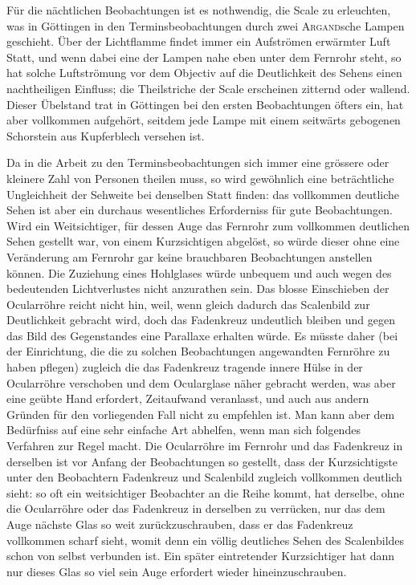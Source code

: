Für die nächtlichen Beobachtungen ist es nothwendig, die Scale zu erleuchten, was in Göttingen in den Terminsbeobachtungen durch zwei \textsc{Argand}sche Lampen geschieht. Über der Lichtflamme findet immer ein Aufströmen erwärmter Luft Statt, und wenn dabei eine der Lampen nahe eben unter dem Fernrohr steht, so hat solche Luftströmung vor dem Objectiv auf die Deutlichkeit des Sehens einen nachtheiligen Einfluss; die Theilstriche der Scale erscheinen zitternd oder wallend. Dieser Übelstand trat in Göttingen bei den ersten Beobachtungen öfters ein, hat aber vollkommen aufgehört, seitdem jede Lampe mit einem seitwärts gebogenen Schorstein aus Kupferblech versehen ist.

Da in die Arbeit zu den Terminsbeobachtungen sich immer eine grössere oder kleinere Zahl von Personen theilen muss, so wird gewöhnlich eine beträchtliche Ungleichheit der Sehweite bei denselben Statt finden: das vollkommen deutliche Sehen ist aber ein durchaus wesentliches Erforderniss für gute Beobachtungen. Wird ein Weitsichtiger, für dessen Auge das Fernrohr zum vollkommen deutlichen Sehen gestellt war, von einem Kurzsichtigen abgelöst, so würde dieser ohne eine Veränderung am Fernrohr gar keine brauchbaren Beobachtungen
anstellen können. Die Zuziehung eines Hohlglases würde unbequem und auch wegen des bedeutenden Lichtverlustes nicht anzurathen sein. Das blosse Einschieben der Ocularröhre reicht nicht hin, weil, wenn gleich dadurch das Scalenbild zur Deutlichkeit gebracht wird, doch das Fadenkreuz undeutlich bleiben und gegen das Bild des Gegenstandes eine Parallaxe erhalten würde. Es müsste daher (bei der Einrichtung, die die zu solchen Beobachtungen angewandten Fernröhre zu haben pflegen) zugleich die das Fadenkreuz tragende innere Hülse in der Ocularröhre verschoben und dem Ocularglase näher gebracht werden, was aber eine geübte Hand erfordert, Zeitaufwand veranlasst, und auch aus andern Gründen für den vorliegenden Fall nicht zu empfehlen ist. Man kann aber dem Bedürfniss auf eine sehr einfache Art abhelfen, wenn man sich folgendes Verfahren zur Regel macht. Die Ocularröhre im Fernrohr und das Fadenkreuz in derselben ist vor Anfang der Beobachtungen so gestellt, dass der Kurzsichtigste unter den Beobachtern Fadenkreuz und Scalenbild zugleich vollkommen deutlich sieht: so oft ein weitsichtiger Beobachter an die Reihe kommt, hat derselbe, ohne die Ocularröhre oder das Fadenkreuz in derselben zu verrücken, nur das dem Auge nächste Glas so weit zurückzuschrauben, dass er das Fadenkreuz vollkommen scharf sieht, womit denn ein völlig deutliches Sehen des Scalenbildes schon von selbst verbunden ist. Ein später eintretender Kurzsichtiger hat dann nur dieses Glas so viel sein Auge erfordert wieder hineinzuschrauben.

